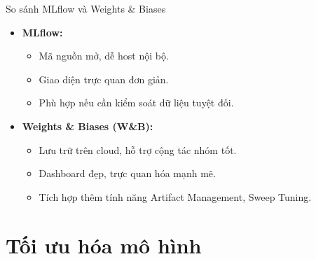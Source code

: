 \documentclass{beamer}
\begin{document}
\begin{frame}{So sánh MLflow và Weights \& Biases}
    \begin{itemize}
        \item \textbf{MLflow:}
        \begin{itemize}
            \item Mã nguồn mở, dễ host nội bộ.
            \item Giao diện trực quan đơn giản.
            \item Phù hợp nếu cần kiểm soát dữ liệu tuyệt đối.
        \end{itemize}
        \item \textbf{Weights \& Biases (W\&B):}
        \begin{itemize}
            \item Lưu trữ trên cloud, hỗ trợ cộng tác nhóm tốt.
            \item Dashboard đẹp, trực quan hóa mạnh mẽ.
            \item Tích hợp thêm tính năng Artifact Management, Sweep Tuning.
        \end{itemize}
    \end{itemize}
\end{frame}
    

\section{Tối ưu hóa mô hình}
\end{document}
